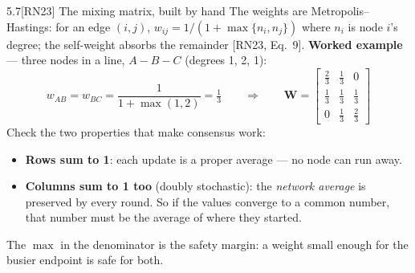 \documentclass[10pt]{beamer}
\newcommand{\RN}[1]{\textcolor{blue!50!black}{[RN23#1]}}
\newcommand{\srcline}[1]{\par\vfill\noindent{\tiny\textcolor{gray}{Source: #1}}}
\begin{document}
\begin{frame}{5.7\quad \RN{} The mixing matrix, built by hand}
The weights are Metropolis--Hastings: for an edge $(i,j)$,
$w_{ij}=1/(1+\max\{n_i,n_j\})$ where $n_i$ is node $i$'s degree; the
self-weight absorbs the remainder \RN{, Eq.~9}.
\vspace{1ex}
\textbf{Worked example} --- three nodes in a line, $A\!-\!B\!-\!C$
(degrees 1, 2, 1):
\[
w_{AB}=w_{BC}=\frac{1}{1+\max(1,2)}=\tfrac13
\qquad\Rightarrow\qquad
\mathbf W=\begin{bmatrix}\tfrac23&\tfrac13&0\\[2pt]
\tfrac13&\tfrac13&\tfrac13\\[2pt]0&\tfrac13&\tfrac23\end{bmatrix}
\]
Check the two properties that make consensus work:
\begin{itemize}
\item \textbf{Rows sum to 1}: each update is a proper average --- no
node can run away.
\item \textbf{Columns sum to 1 too} (doubly stochastic): the
\emph{network average} is preserved by every round. So if the values
converge to a common number, that number must be the average of where
they started.
\end{itemize}
The $\max$ in the denominator is the safety margin: a weight small
enough for the busier endpoint is safe for both.
\srcline{[RN23] Eq.~9; worked example: this deck.}
\end{frame}
\end{document}
